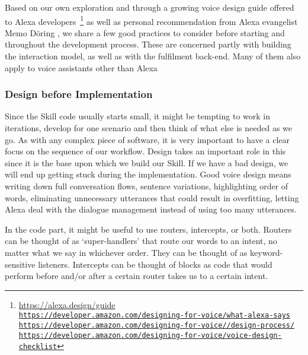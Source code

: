 Based on our own exploration and through a growing voice design guide offered to Alexa developers~\footnote{\url{https://alexa.design/guide} \\ \href{https://developer.amazon.com/designing-for-voice/what-alexa-says/}{\lstinline|https://developer.amazon.com/designing-for-voice/what-alexa-says|}\\
	\href{https://developer.amazon.com/designing-for-voice/design-process/}{\lstinline|https://developer.amazon.com/designing-for-voice//design-process/|}\\
	\href{https://developer.amazon.com/designing-for-voice/voice-design-checklist}{\lstinline|https://developer.amazon.com/designing-for-voice/voice-design-checklist|}
} as well as personal recommendation from Alexa evangelist Memo Döring \cite{memo:devDay}, we share a few good practices to consider before starting and throughout the development process. These are concerned partly with building the interaction model, as well as with the fulfilment back-end. Many of them also apply to voice assistants other than Alexa






\subsubsection*{Design before Implementation}
Since the Skill code usually starts small, it might be tempting to work in iterations, develop for one scenario and then think of what else is needed as we go.
As with any complex piece of software, it is very important to have a clear focus on the sequence of our workflow. Design takes an important role in this since it is the base upon which we build our Skill. If we have a bad design, we will end up getting stuck during the implementation. Good voice design means writing down full conversation flows, sentence variations, highlighting order of words, eliminating unnecessary utterances that could result in overfitting, letting Alexa deal with the dialogue management instead of using too many utterances.

In the code part, it might be useful to use routers, intercepts, or both.
Routers can be thought of as `super-handlers' that route our words to an intent, no matter what we say in whichever order. They can be thought of as keyword-sensitive listeners. Intercepts can be thought of blocks as code that would perform before and/or after a certain router takes us to a certain intent.

